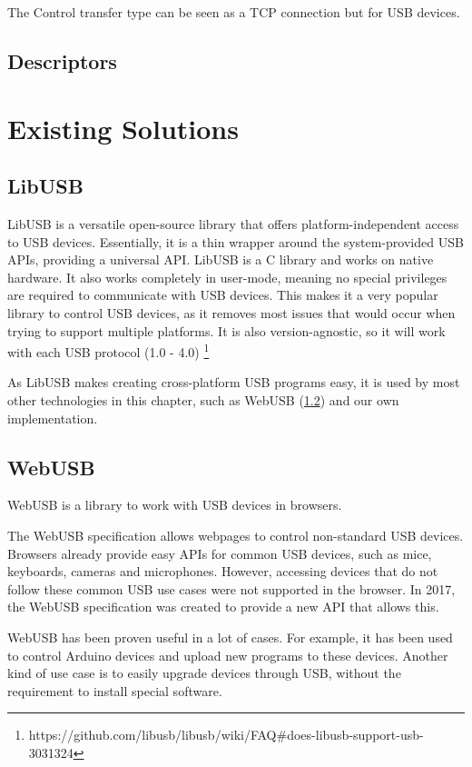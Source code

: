 The Control transfer type can be seen as a TCP connection but for USB devices.

\subsection{Descriptors}

\section{Existing Solutions}

\subsection{LibUSB}
LibUSB is a versatile open-source library that offers platform-independent access to USB devices. Essentially, it is a thin wrapper around the system-provided USB APIs, providing a universal API. LibUSB is a C library and works on native hardware. It also works completely in user-mode, meaning no special privileges are required to communicate with USB devices. This makes it a very popular library to control USB devices, as it removes most issues that would occur when trying to support multiple platforms. It is also version-agnostic, so it will work with each USB protocol (1.0 - 4.0) \footnote{https://github.com/libusb/libusb/wiki/FAQ\#does-libusb-support-usb-3031324}

As LibUSB makes creating cross-platform USB programs easy, it is used by most other technologies in this chapter, such as WebUSB (\ref{section:WebUSB}) and our own implementation.

\subsection{WebUSB}
\label{section:WebUSB}

WebUSB is a library to work with USB devices in browsers.

The WebUSB specification allows webpages to control non-standard USB devices. Browsers already provide easy APIs for common USB devices, such as mice, keyboards, cameras and microphones. However, accessing devices that do not follow these common USB use cases were not supported in the browser. In 2017, the WebUSB specification was created to provide a new API that allows this.

WebUSB has been proven useful in a lot of cases. For example, it has been used to control Arduino devices and upload new programs to these devices. Another kind of use case is to easily upgrade devices through USB, without the requirement to install special software. 

